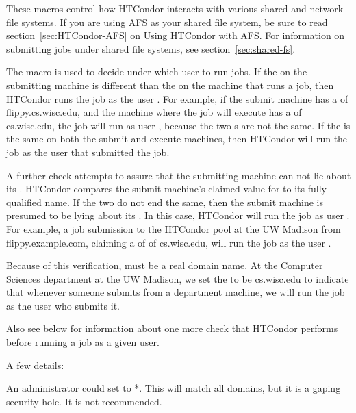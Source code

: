 These macros control how HTCondor interacts with various shared and
network file systems.  If you are using AFS as your shared file system,
be sure to read section~\ref{sec:HTCondor-AFS} on Using HTCondor with
AFS.
For information on submitting jobs under shared file systems,
see
section~\ref{sec:shared-fs}.
\begin{description}

\label{param:UidDomain}
\item[\Macro{UID\_DOMAIN}]
  The  macro
  is used to decide under which user to run jobs.
  If the 
  on the submitting machine is different than
  the 
  on the machine that runs a job, then HTCondor runs
  the job as the user .
  For example, if the submit machine has
  a  of
  flippy.cs.wisc.edu, and the machine where the job will execute
  has a  of
  cs.wisc.edu, the job will run as user , because
  the two s are not the same.
  If the 
  is the same on both the submit and execute machines,
  then HTCondor will run the job as the user that submitted the job.

  A further check attempts to assure that the submitting
  machine can not lie about its .
  HTCondor compares the 
  submit machine's claimed value for 
  to its fully qualified name.
  If the two do not end the same, then the submit machine
  is presumed to be lying about its .
  In this case, HTCondor will run the job as user .
  For example, a job submission to the HTCondor pool at the UW Madison
  from flippy.example.com, claiming a  of
  of cs.wisc.edu,
  will run the job as the user .

  Because of this verification,
   must be a real domain name.
  At the Computer Sciences department
  at the UW Madison, we set the 
  to be cs.wisc.edu to
  indicate that whenever someone submits from a department machine, we
  will run the job as the user who submits it.

  Also see 
  below for information about one more check
  that HTCondor performs before running a job as a given user.

  A few details:

  An administrator could set 
  to *. This will match all domains,
  but it is a gaping security hole. It is not recommended.


\end{description}
